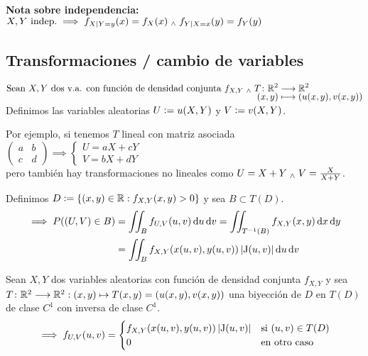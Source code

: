 \textbf{Nota sobre independencia:} $X, Y \text{ indep.} \implies f_{X|Y=y}(x) = f_X(x) \; _{\wedge} \; f_{Y|X=x}(y) = f_Y(y)$

\subsection{Transformaciones / cambio de variables}

$\begin{aligned}
		\text{Sean }X, Y \text{ dos v.a. con función de densidad conjunta }f_{X, Y} \; _{\wedge} \; T\colon \mathbb{R}^2 & \longrightarrow  \mathbb{R}^2          \\[-0.6em]
		(x, y)                                                                                     & \longmapsto (u(x, y), v(x, y))
	\end{aligned}$\\
Definimos las variables aleatorias $U \vcentcolon= u(X, Y)$ y $V \vcentcolon= v(X, Y)$.

Por ejemplo, si tenemos $T$ lineal con matriz asociada $\begin{pmatrix}
		a & b \\
		c & d
	\end{pmatrix} \implies \begin{cases}
		U = aX + cY \\
		V = bX + dY
	\end{cases}$ \\pero también hay transformaciones no lineales como $U = X + Y \; _{\wedge} \; V = \frac{X}{X+Y}$.

Definimos $D\vcentcolon= \{(x, y) \in \mathbb{R} : f_{X, Y}(x, y) > 0\}$ y sea $B \subset T(D)$.
\[\begin{aligned}
		\implies P((U, V) \in B) & = \iint_B f_{U, V}(u, v) \odif{u} \odif{v} = \iint_{T^{-1}(B)} f_{X, Y}(x, y) \odif{x} \odif{y} \\
		                         & = \iint_{B} f_{X, Y}(x(u, v), y(u, v)) \abs{\operatorname{J}(u, v)} \odif{u} \odif{v}
	\end{aligned}\]

\begin{teo}
	Sean $X, Y$ dos variables aleatorias con función de densidad conjunta $f_{X, Y}$ y sea $T \colon \mathbb{R}^2 \longrightarrow \mathbb{R}^2 : (x, y) \mapsto T(x, y) = (u(x, y), v(x, y))$ una biyección de $D$ en $T(D)$ de clase $C^1$ con inversa de clase $C^1$.
	\[\implies f_{U, V}(u, v) = \begin{cases}
			f_{X, Y}(x(u, v), y(u, v)) \left|\operatorname{J}(u, v)\right| & \text{si } (u, v) \in T(D) \\
			0                                                       & \text{en otro caso}
		\end{cases}\]
\end{teo}

